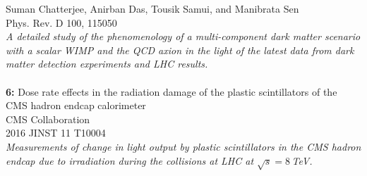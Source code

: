 \documentclass[a4paper,11pt]{article}
\begin{document}
Suman Chatterjee, Anirban Das, Tousik Samui, and Manibrata Sen\\
Phys. Rev. D 100, 115050\\
\textit{A detailed study of the phenomenology of a multi-component dark matter scenario with
a scalar WIMP and the QCD axion in the light of the latest data from dark matter detection experiments and
LHC results.}\\
\\
\textbf{6:} {Dose rate effects in the radiation damage of the plastic scintillators of the CMS hadron endcap calorimeter}\\
CMS Collaboration \\
2016 JINST 11 T10004\\
\textit{Measurements of change in light output by plastic scintillators in the CMS hadron endcap due to irradiation during the collisions at LHC at $\sqrt{s} = 8$\,TeV.}\\


\end{document}
